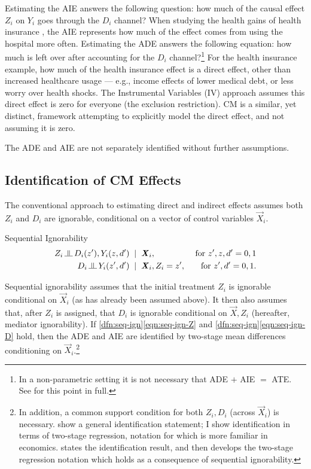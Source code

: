 Estimating the AIE answers the following question: how much of the causal effect $Z_i$ on $Y_i$ goes through the $D_i$ channel?
When studying the health gains of health insurance \citep{finkelstein2008oregon}, the AIE represents how much of the effect comes from using the hospital more often.
Estimating the ADE answers the following equation: how much is left over after accounting for the $D_i$ channel?\footnote{
    In a non-parametric setting it is not necessary that ADE $+$ AIE $=$ ATE.
    See \cite{imai2010identification} for this point in full.
}
For the health insurance example, how much of the health insurance effect is a direct effect, other than increased healthcare usage --- e.g., income effects of lower medical debt, or less worry over health shocks.
The Instrumental Variables (IV) approach assumes this direct effect is zero for everyone (the exclusion restriction).
CM is a similar, yet distinct, framework attempting to explicitly model the direct effect, and not assuming it is zero.

The ADE and AIE are not separately identified without further assumptions.

\subsection{Identification of CM Effects}
The conventional approach to estimating direct and indirect effects assumes both $Z_i$ and $D_i$ are ignorable, conditional on a vector of control variables $\vec X_i$.
\begin{definition}
    \label{dfn:seq-ign}
    Sequential Ignorability \citep{imai2010identification}
    \begin{align}
        \label{eqn:seq-ign-Z}
        Z_i \indep  D_i(z'), Y_i(z, d') \;\; &| \;\; \vec X_i,
            &\textnormal{ for } z', z, d' = 0, 1 \\
        \label{eqn:seq-ign-D}
        D_i \indep Y_i(z', d') \;\; &| \;\; \vec X_i, Z_i = z', 
            &\textnormal{ for } z', d' = 0, 1.
    \end{align}
\end{definition}
Sequential ignorability assumes that the initial treatment $Z_i$ is ignorable conditional on $\vec X_i$ (as has already been assumed above).
It then also assumes that, after $Z_i$ is assigned, that $D_i$ is ignorable conditional on $\vec X, Z_i$ (hereafter, mediator ignorability).
If \ref{dfn:seq-ign}\eqref{eqn:seq-ign-Z} and \ref{dfn:seq-ign}\eqref{eqn:seq-ign-D} hold, then the ADE and AIE are identified by two-stage mean differences conditioning on $\vec X_i$.\footnote{
    In addition, a common support condition for both $Z_i, D_i$ (across $\vec X_i$) is necessary.
    \cite{imai2010identification} show a general identification statement; I show identification in terms of two-stage regression, notation for which is more familiar in economics.
     states the \cite{imai2010identification} identification result, and then develops the two-stage regression notation which holds as a consequence of sequential ignorability.
}
\vspace{0.1cm}


